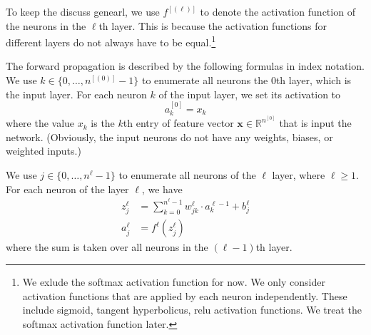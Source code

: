 \documentclass[12pt]{article}
\newcommand{\R}{\mathbb{R}}
\newcommand{\x}{\boldsymbol{x}}
\newcommand{\y}{\boldsymbol{y}}
\begin{document}
\medskip
\begin{center}
\end{center}

To keep the discuss genearl, we use $f^{[(\ell)]}$ to denote the activation function of the neurons in the $\ell$th layer. This is because the activation functions for different layers do not always have to be equal.\footnote{We exlude the softmax activation function for now. We only consider activation functions that are applied by each neuron independently. These include sigmoid, tangent hyperbolicus, relu activation functions. We treat the softmax activation function later.}

The forward propagation is described by the following formulas in index notation. We use $k\in\{0,\ldots,n^{[(0)]}-1\}$ to enumerate all neurons the $0$th layer, which is the input layer. For each neuron $k$ of the input layer, we set its activation to
\begin{equation}
  a^{[0]}_k = x_k
\end{equation}
where the value $x_k$ is the $k$th entry of feature vector $\x\in\R^{n^{[0]}}$ that is input the network. (Obviously, the input neurons do not have any weights, biases, or weighted inputs.)

We use $j\in\{0,\ldots,n^\ell-1\}$ to enumerate all neurons of the $\ell$ layer, where $\ell\ge 1$. For each neuron of the layer $\ell$, we have
\begin{align}
z^\ell_j &= \sum_{k=0}^{n^\ell-1} w^\ell_{jk} \cdot a^{\ell-1}_k + b^\ell_j \\
a^\ell_j &= f^\ell(z^\ell_j)
\end{align}
where the sum is taken over all neurons in the $(\ell-1)$th layer. 
\end{document}
